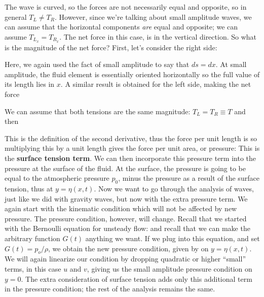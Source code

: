 \documentclass[12pt]{book}
\begin{document}


The wave is curved, so the forces are not necessarily equal and opposite, so in general $T_L\ne T_R$. However, since we're talking about small amplitude waves, we can assume that the horizontal components \textit{are} equal and opposite; we can assume $T_{L_x} = T_{R_x}$.  The net force in this case, is in the vertical direction.  So what is the magnitude of the net force? First, let's consider the right side:




Here, we again used the fact of small amplitude to say that $ds = dx$.  At small amplitude, the fluid element is essentially oriented horizontally so the full value of its length lies in $x$.  A similar result is obtained for the left side, making the net force



We can assume that both tensions are the same magnitude: $T_L=T_R\equiv T$ and then

This is the definition of the second derivative, thus the force per unit length is
so multiplying this by a unit length gives the force per unit area, or pressure:
This is the \textbf{surface tension term}.  %
We can then incorporate this pressure term into the pressure at the surface of the fluid.  At the surface, the pressure is going to be equal to the atmospheric pressure $p_0$, minus the pressure as a result of the surface tension, thus
at $y=\eta(x,t)$.  Now we want to go through the analysis of waves, just like we did with gravity waves, but now with the extra pressure term.  We again start with the kinematic condition
which will not be affected by new pressure.  The pressure condition,
however, will change.  Recall that we started with the Bernoulli equation for unsteady flow:
 and recall that we can make the arbitrary function $G(t)$ anything we want.  If we plug   into this equation, and set $G(t) = p_o/\rho$, we obtain the new pressure condition, given by
on $y=\eta(x,t)$.  We will again linearize our condition by dropping quadratic or higher ``small'' terms, in this case $u$ and $v$, giving us the small amplitude pressure condition
on $y=0$.  The extra consideration of surface tension adds only this additional term in the pressure condition; the rest of the analysis remains the same.
\end{document}
